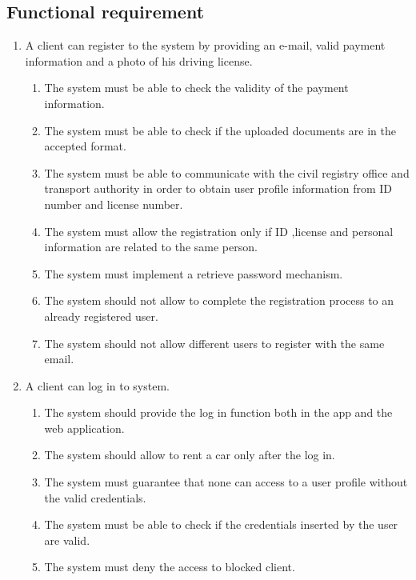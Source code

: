 \subsection{Functional requirement}
\begin{enumerate}
\item A client can register to the system by providing an e-mail, valid payment information and a photo of his driving license.
\begin{enumerate}
\item The system must be able to check the validity of the payment information.
\item The system must be able to check if the uploaded documents are in the accepted format.
\item The system must be able to communicate with the civil registry office and transport authority in order to obtain user profile information from ID number and license number.
\item The system must allow the registration only if ID ,license and personal information are related to the same person.
\item The system must implement a retrieve password mechanism.
\item The system should not allow to complete the registration process to an already registered user.
\item The system should not allow different users to register with the same email.
\end{enumerate}

\item A client can log in to system.
\begin{enumerate}
\item The system should provide the log in function both in the app and the web application.
\item The system should allow to rent a car only after the log in.
\item The system must guarantee that none can access to a user profile without the valid credentials.
\item The system must be able to check if the credentials inserted by the user are valid.
\item The system must deny the access to blocked client.
\end{enumerate}


\end{enumerate}
